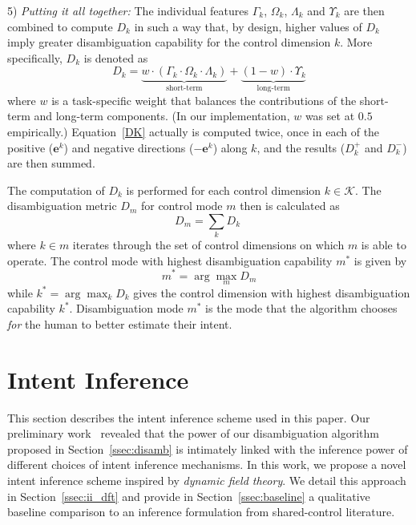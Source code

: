 \documentclass[natbib, twocolumn]{svjour3}          %
\newcommand{\argmax}{\arg\!\max}
\begin{document}
5) \textit{Putting it all together:} 
The individual features $\Gamma_k$, $\Omega_k$, $\Lambda_k$ and $\Upsilon_k$ are then combined to compute $D_{k}$ in such a way that, by design, higher values of $D_k$ imply greater disambiguation capability for the control dimension $k$. More specifically, $D_k$ is denoted as 
\begin{equation}\label{DK}
D_{k} = \underbrace{w\cdot(\Gamma_k\cdot \Omega_k\cdot\Lambda_k)}_{\text{short-term}} + \underbrace{(1 - w)\cdot \Upsilon_k}_{\text{long-term}}
\end{equation}
where $w$ is a task-specific weight that balances the contributions of the short-term and long-term components. (In our implementation, $w$ was set at $0.5$ empirically.) Equation~\ref{DK} actually is computed twice, once in each of the positive ($\boldsymbol{e}^k$) and negative directions ($-\boldsymbol{e}^k$) along $k$, and the results ($D_k^+$ and $D_k^-$) are then summed. 

The computation of $D_k$ is performed for each control dimension $k \in \mathcal{K}$. The disambiguation metric $D_m$ for control mode $m$ then is calculated as 
\begin{equation*}\label{EQ2}
D_m = \sum_{k} D_{k} \;
\end{equation*}
where $k \in m$ iterates through the set of control dimensions on which $m$ is able to operate.
The control mode with highest disambiguation capability $m^*$ is given by
\begin{equation*}
m^* = \argmax_m  D_{m}
\end{equation*}
while $k^* = \argmax_k D_k$ gives the control dimension with highest disambiguation capability $k^{*}$.
Disambiguation mode $m^{*}$ is the mode that the algorithm chooses \textit{for} the human to better estimate their intent. 

\section{Intent Inference}\label{sec:inference}
This section describes the intent inference scheme used in this paper. Our preliminary work~\citep{gopinath2017mode} revealed that the power of our disambiguation algorithm proposed in Section~\ref{ssec:disamb} is intimately linked with the inference power of different choices of intent inference mechanisms. In this work, we propose a novel intent inference scheme inspired by \textit{dynamic field theory}. We detail this approach in Section~\ref{ssec:ii_dft} and provide in Section~\ref{ssec:baseline} a qualitative baseline comparison to an inference formulation from shared-control literature. 
\end{document}
